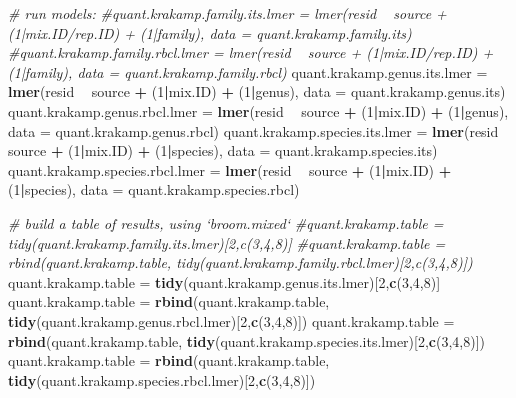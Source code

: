 \documentclass[
]{article}
\newenvironment{Shaded}{\begin{snugshade}}{\end{snugshade}}
\newcommand{\CommentTok}[1]{\textcolor[rgb]{0.56,0.35,0.01}{\textit{#1}}}
\newcommand{\DataTypeTok}[1]{\textcolor[rgb]{0.13,0.29,0.53}{#1}}
\newcommand{\DecValTok}[1]{\textcolor[rgb]{0.00,0.00,0.81}{#1}}
\newcommand{\KeywordTok}[1]{\textcolor[rgb]{0.13,0.29,0.53}{\textbf{#1}}}
\newcommand{\NormalTok}[1]{#1}
\newcommand{\OperatorTok}[1]{\textcolor[rgb]{0.81,0.36,0.00}{\textbf{#1}}}
\newcommand{\StringTok}[1]{\textcolor[rgb]{0.31,0.60,0.02}{#1}}
\begin{document}
\begin{Shaded}
\begin{Highlighting}[]
{{{{{{\CommentTok{# run models:}
\CommentTok{#quant.krakamp.family.its.lmer = lmer(resid ~ source + (1|mix.ID/rep.ID) + (1|family), data = quant.krakamp.family.its)}
\CommentTok{#quant.krakamp.family.rbcl.lmer = lmer(resid ~ source + (1|mix.ID/rep.ID) + (1|family), data = quant.krakamp.family.rbcl)}
\NormalTok{quant.krakamp.genus.its.lmer =}\StringTok{ }\KeywordTok{lmer}\NormalTok{(resid }\OperatorTok{~}\StringTok{ }\NormalTok{source }\OperatorTok{+}\StringTok{ }\NormalTok{(}\DecValTok{1}\OperatorTok{|}\NormalTok{mix.ID) }\OperatorTok{+}\StringTok{ }\NormalTok{(}\DecValTok{1}\OperatorTok{|}\NormalTok{genus), }\DataTypeTok{data =}\NormalTok{ quant.krakamp.genus.its)}
\NormalTok{quant.krakamp.genus.rbcl.lmer =}\StringTok{ }\KeywordTok{lmer}\NormalTok{(resid }\OperatorTok{~}\StringTok{ }\NormalTok{source }\OperatorTok{+}\StringTok{ }\NormalTok{(}\DecValTok{1}\OperatorTok{|}\NormalTok{mix.ID) }\OperatorTok{+}\StringTok{ }\NormalTok{(}\DecValTok{1}\OperatorTok{|}\NormalTok{genus), }\DataTypeTok{data =}\NormalTok{ quant.krakamp.genus.rbcl)}
\NormalTok{quant.krakamp.species.its.lmer =}\StringTok{ }\KeywordTok{lmer}\NormalTok{(resid }\OperatorTok{~}\StringTok{ }\NormalTok{source }\OperatorTok{+}\StringTok{ }\NormalTok{(}\DecValTok{1}\OperatorTok{|}\NormalTok{mix.ID) }\OperatorTok{+}\StringTok{ }\NormalTok{(}\DecValTok{1}\OperatorTok{|}\NormalTok{species), }\DataTypeTok{data =}\NormalTok{ quant.krakamp.species.its)}
\NormalTok{quant.krakamp.species.rbcl.lmer =}\StringTok{ }\KeywordTok{lmer}\NormalTok{(resid }\OperatorTok{~}\StringTok{ }\NormalTok{source }\OperatorTok{+}\StringTok{ }\NormalTok{(}\DecValTok{1}\OperatorTok{|}\NormalTok{mix.ID) }\OperatorTok{+}\StringTok{ }\NormalTok{(}\DecValTok{1}\OperatorTok{|}\NormalTok{species), }\DataTypeTok{data =}\NormalTok{ quant.krakamp.species.rbcl)}

\CommentTok{# build a table of results, using `broom.mixed`}
\CommentTok{#quant.krakamp.table = tidy(quant.krakamp.family.its.lmer)[2,c(3,4,8)]}
\CommentTok{#quant.krakamp.table = rbind(quant.krakamp.table, tidy(quant.krakamp.family.rbcl.lmer)[2,c(3,4,8)])}
\NormalTok{quant.krakamp.table =}\StringTok{ }\KeywordTok{tidy}\NormalTok{(quant.krakamp.genus.its.lmer)[}\DecValTok{2}\NormalTok{,}\KeywordTok{c}\NormalTok{(}\DecValTok{3}\NormalTok{,}\DecValTok{4}\NormalTok{,}\DecValTok{8}\NormalTok{)]}
\NormalTok{quant.krakamp.table =}\StringTok{ }\KeywordTok{rbind}\NormalTok{(quant.krakamp.table, }\KeywordTok{tidy}\NormalTok{(quant.krakamp.genus.rbcl.lmer)[}\DecValTok{2}\NormalTok{,}\KeywordTok{c}\NormalTok{(}\DecValTok{3}\NormalTok{,}\DecValTok{4}\NormalTok{,}\DecValTok{8}\NormalTok{)])}
\NormalTok{quant.krakamp.table =}\StringTok{ }\KeywordTok{rbind}\NormalTok{(quant.krakamp.table, }\KeywordTok{tidy}\NormalTok{(quant.krakamp.species.its.lmer)[}\DecValTok{2}\NormalTok{,}\KeywordTok{c}\NormalTok{(}\DecValTok{3}\NormalTok{,}\DecValTok{4}\NormalTok{,}\DecValTok{8}\NormalTok{)])}
\NormalTok{quant.krakamp.table =}\StringTok{ }\KeywordTok{rbind}\NormalTok{(quant.krakamp.table, }\KeywordTok{tidy}\NormalTok{(quant.krakamp.species.rbcl.lmer)[}\DecValTok{2}\NormalTok{,}\KeywordTok{c}\NormalTok{(}\DecValTok{3}\NormalTok{,}\DecValTok{4}\NormalTok{,}\DecValTok{8}\NormalTok{)])}

}}}}}}
\end{Highlighting}
\end{Shaded}
\end{document}
